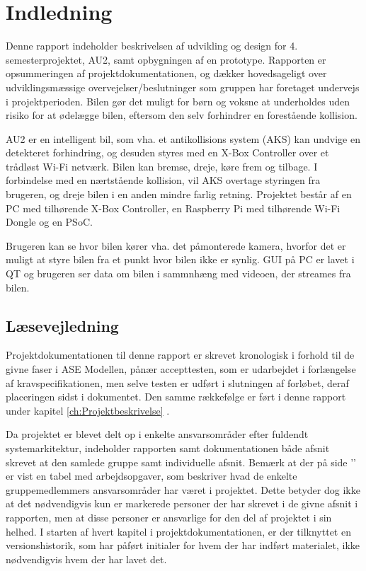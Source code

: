 \chapter{Indledning}
\label{ch:Indledning}

Denne rapport indeholder beskrivelsen af udvikling og design for 4. semesterprojektet, AU2, samt opbygningen af en prototype. 
Rapporten er opsummeringen af projektdokumentationen, og dækker hovedsageligt over udviklingsmæssige overvejelser/beslutninger som gruppen har foretaget undervejs i projektperioden. 
Bilen gør det muligt for børn og voksne at underholdes uden risiko for at ødelægge bilen, eftersom den selv forhindrer en forestående kollision.

AU2 er en intelligent bil, som vha. et antikollisions system (AKS) kan undvige en detekteret forhindring, og desuden styres med en X-Box Controller over et trådløst Wi-Fi netværk. Bilen kan bremse, dreje, køre frem og tilbage.
I forbindelse med en nærtstående kollision, vil AKS overtage styringen fra brugeren, og dreje bilen i en anden mindre farlig retning. 
Projektet består af en PC med tilhørende X-Box Controller, en Raspberry Pi med tilhørende Wi-Fi Dongle og en PSoC. 

Brugeren kan se hvor bilen kører vha. det påmonterede kamera, hvorfor det er muligt at styre bilen fra et punkt hvor bilen ikke er synlig.
GUI på PC er lavet i QT og brugeren ser data om bilen i sammnhæng med videoen, der streames fra bilen.

\section{Læsevejledning}
Projektdokumentationen til denne rapport er skrevet kronologisk i forhold til de givne faser i ASE Modellen\cite{lib:vejledning}, pånær accepttesten, som er udarbejdet i forlængelse af kravspecifikationen, men selve testen er udført i slutningen af forløbet, deraf placeringen sidst i dokumentet.
Den samme rækkefølge er ført i denne rapport under kapitel \ref{ch:Projektbeskrivelse} .

Da projektet er blevet delt op i enkelte ansvarsområder efter fuldendt systemarkitektur, indeholder rapporten samt dokumentationen både afsnit skrevet at den samlede gruppe samt individuelle afsnit.
Bemærk at der på side '\pageref{ch:arbejdsopgaver}' er vist en tabel med arbejdsopgaver, som beskriver hvad de enkelte gruppemedlemmers ansvarsområder har været i projektet. 
Dette betyder dog ikke at det nødvendigvis kun er markerede personer der har skrevet i de givne afsnit i rapporten, men at disse personer er ansvarlige for den del af projektet i sin helhed.
I starten af hvert kapitel i projektdokumentationen, er der tilknyttet en versionshistorik, som har påført initialer for hvem der har indført materialet, ikke nødvendigvis hvem der har lavet det.


